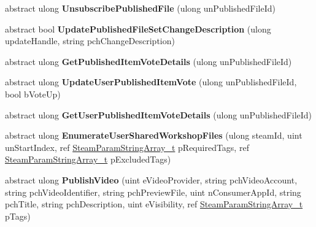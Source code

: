 \begin{DoxyCompactItemize}
\item 
\hypertarget{classValve_1_1Steamworks_1_1ISteamRemoteStorage_a316256e346c24d7384a4136387c17dc7}{}abstract ulong {\bfseries Unsubscribe\+Published\+File} (ulong un\+Published\+File\+Id)\label{classValve_1_1Steamworks_1_1ISteamRemoteStorage_a316256e346c24d7384a4136387c17dc7}

\item 
\hypertarget{classValve_1_1Steamworks_1_1ISteamRemoteStorage_acc148cb88789f6f710e61bfe67f30022}{}abstract bool {\bfseries Update\+Published\+File\+Set\+Change\+Description} (ulong update\+Handle, string pch\+Change\+Description)\label{classValve_1_1Steamworks_1_1ISteamRemoteStorage_acc148cb88789f6f710e61bfe67f30022}

\item 
\hypertarget{classValve_1_1Steamworks_1_1ISteamRemoteStorage_a70330fa5e560b4d7113ebc1aed130bf5}{}abstract ulong {\bfseries Get\+Published\+Item\+Vote\+Details} (ulong un\+Published\+File\+Id)\label{classValve_1_1Steamworks_1_1ISteamRemoteStorage_a70330fa5e560b4d7113ebc1aed130bf5}

\item 
\hypertarget{classValve_1_1Steamworks_1_1ISteamRemoteStorage_ac7d1ff6874a3eae64dfcd8ca951d1e52}{}abstract ulong {\bfseries Update\+User\+Published\+Item\+Vote} (ulong un\+Published\+File\+Id, bool b\+Vote\+Up)\label{classValve_1_1Steamworks_1_1ISteamRemoteStorage_ac7d1ff6874a3eae64dfcd8ca951d1e52}

\item 
\hypertarget{classValve_1_1Steamworks_1_1ISteamRemoteStorage_aeb2be984712de4e15eb923f98fd1d860}{}abstract ulong {\bfseries Get\+User\+Published\+Item\+Vote\+Details} (ulong un\+Published\+File\+Id)\label{classValve_1_1Steamworks_1_1ISteamRemoteStorage_aeb2be984712de4e15eb923f98fd1d860}

\item 
\hypertarget{classValve_1_1Steamworks_1_1ISteamRemoteStorage_a10959314e6e75b8f7da4a605fa0f31f1}{}abstract ulong {\bfseries Enumerate\+User\+Shared\+Workshop\+Files} (ulong steam\+Id, uint un\+Start\+Index, ref \hyperlink{structValve_1_1Steamworks_1_1SteamParamStringArray__t}{Steam\+Param\+String\+Array\+\_\+t} p\+Required\+Tags, ref \hyperlink{structValve_1_1Steamworks_1_1SteamParamStringArray__t}{Steam\+Param\+String\+Array\+\_\+t} p\+Excluded\+Tags)\label{classValve_1_1Steamworks_1_1ISteamRemoteStorage_a10959314e6e75b8f7da4a605fa0f31f1}

\item 
\hypertarget{classValve_1_1Steamworks_1_1ISteamRemoteStorage_ac72d3abdbe807aafb4c2e69b3cf267c0}{}abstract ulong {\bfseries Publish\+Video} (uint e\+Video\+Provider, string pch\+Video\+Account, string pch\+Video\+Identifier, string pch\+Preview\+File, uint n\+Consumer\+App\+Id, string pch\+Title, string pch\+Description, uint e\+Visibility, ref \hyperlink{structValve_1_1Steamworks_1_1SteamParamStringArray__t}{Steam\+Param\+String\+Array\+\_\+t} p\+Tags)\label{classValve_1_1Steamworks_1_1ISteamRemoteStorage_ac72d3abdbe807aafb4c2e69b3cf267c0}


\end{DoxyCompactItemize}
